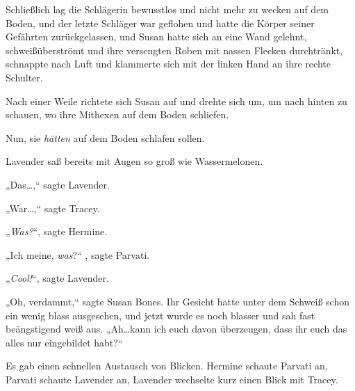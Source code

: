 Schließlich lag die Schlägerin bewusstlos und nicht mehr zu wecken auf dem Boden, und der letzte Schläger war geflohen und hatte die Körper seiner Gefährten zurückgelassen, und Susan hatte sich an eine Wand gelehnt, schweißüberströmt und ihre versengten Roben mit nassen Flecken durchtränkt, schnappte nach Luft und klammerte sich mit der linken Hand an ihre rechte Schulter.

Nach einer Weile richtete sich Susan auf und drehte sich um, um nach hinten zu schauen, wo ihre Mithexen auf dem Boden schliefen.

Nun, sie \emph{hätten} auf dem Boden schlafen sollen.

Lavender saß bereits mit Augen so groß wie Wassermelonen.

„Das…,“ sagte Lavender.

„War…,“ sagte Tracey.

„\emph{Was?}“, sagte Hermine.

„Ich meine, \emph{was}?“ , sagte Parvati.

„\emph{Cool!}“, sagte Lavender.

„Oh, verdammt,“ sagte Susan Bones. Ihr Gesicht hatte unter dem Schweiß schon ein wenig blass ausgesehen, und jetzt wurde es noch blasser und sah fast beängstigend weiß aus. „Ah…kann ich euch davon überzeugen, dass ihr euch das alles nur eingebildet habt?“

Es gab einen schnellen Austausch von Blicken. Hermine schaute Parvati an, Parvati schaute Lavender an, Lavender wechselte kurz einen Blick mit Tracey.

